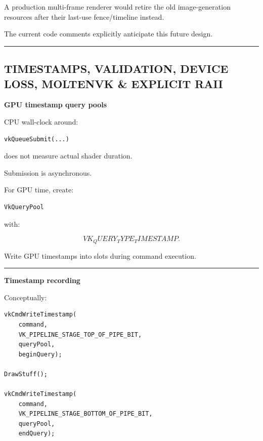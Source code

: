 A production multi-frame renderer would retire the old image-generation resources after their last-use fence/timeline instead.

The current code comments explicitly anticipate this future design.

\begin{center}\rule{0.5\linewidth}{0.5pt}\end{center}

\subsection{TIMESTAMPS, VALIDATION, DEVICE LOSS, MOLTENVK \& EXPLICIT RAII}\label{01-foundations-i-ch014-timestamps-validation-device-loss-moltenvk-explicit-raii}

\hypertarget{01-foundations-i-ch014-timestamps-validation-device-loss-moltenvk-explicit-raii}{}

\textbf{GPU timestamp query pools}

CPU wall-clock around:

\begin{verbatim}
vkQueueSubmit(...)
\end{verbatim}

does not measure actual shader duration.

Submission is asynchronous.

For GPU time, create:

\begin{verbatim}
VkQueryPool
\end{verbatim}

with:

\[
VK_QUERY_TYPE_TIMESTAMP.
\]

Write GPU timestamps into slots during command execution.

\begin{center}\rule{0.5\linewidth}{0.5pt}\end{center}

\textbf{Timestamp recording}

Conceptually:

\begin{verbatim}
vkCmdWriteTimestamp(
    command,
    VK_PIPELINE_STAGE_TOP_OF_PIPE_BIT,
    queryPool,
    beginQuery);

DrawStuff();

vkCmdWriteTimestamp(
    command,
    VK_PIPELINE_STAGE_BOTTOM_OF_PIPE_BIT,
    queryPool,
    endQuery);
\end{verbatim}

